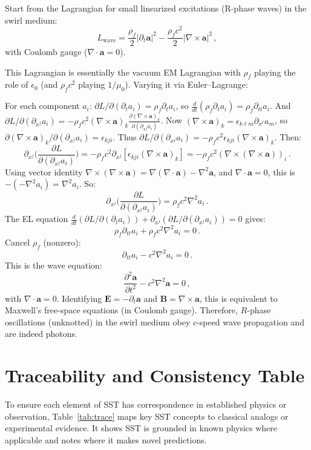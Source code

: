 \documentclass[10pt,reprint,aps,onecolumn,nofootinbib]{revtex4-2}
\begin{document}
	Start from the Lagrangian for small linearized excitations (R-phase waves) in the swirl medium:
	\[
		L_{\text{wave}} = \frac{\rho_f}{2}|\partial_t \mathbf{a}|^2 - \frac{\rho_f c^2}{2}|\nabla \times \mathbf{a}|^2\,,
	\]
	with Coulomb gauge ($\nabla \cdot \mathbf{a}=0$).

	This Lagrangian is essentially the vacuum EM Lagrangian with $\rho_f$ playing the role of $\epsilon_0$ (and $\rho_f c^2$ playing $1/\mu_0$). Varying it via Euler–Lagrange:

	For each component $a_i$: $\partial L/\partial(\partial_t a_i) = \rho_f \partial_t a_i$, so $\frac{d}{dt}(\rho_f \partial_t a_i) = \rho_f \partial_{tt} a_i$. And $\partial L/\partial(\partial_{x^j} a_i) = -\rho_f c^2 (\nabla \times \mathbf{a})_k \frac{\partial (\nabla \times \mathbf{a})_k}{\partial(\partial_{x^j}a_i)}$. Now $(\nabla \times \mathbf{a})_k = \epsilon_{k\ell m}\partial_{x^\ell} a_m$, so $\partial(\nabla \times \mathbf{a})_k/\partial(\partial_{x^j}a_i) = \epsilon_{kji}$. Thus $\partial L/\partial(\partial_{x^j} a_i) = -\rho_f c^2 \epsilon_{kji}(\nabla \times \mathbf{a})_k$. Then:
	\[
		\partial_{x^j}\Big(\frac{\partial L}{\partial(\partial_{x^j} a_i)}\Big) = -\rho_f c^2 \partial_{x^j}[\epsilon_{kji}(\nabla \times \mathbf{a})_k] = -\rho_f c^2 (\nabla \times (\nabla \times \mathbf{a}))_i\,.
	\]
	Using vector identity $\nabla \times (\nabla \times \mathbf{a}) = \nabla(\nabla\cdot\mathbf{a}) - \nabla^2 \mathbf{a}$, and $\nabla\cdot\mathbf{a}=0$, this is $-(-\nabla^2 a_i) = \nabla^2 a_i$. So:
	\[
		\partial_{x^j}\Big(\frac{\partial L}{\partial(\partial_{x^j} a_i)}\Big) = \rho_f c^2 \nabla^2 a_i\,.
	\]
	The EL equation $\frac{d}{dt}(\partial L/\partial(\partial_t a_i)) + \partial_{x^j}(\partial L/\partial(\partial_{x^j}a_i))=0$ gives:
	\[
		\rho_f \partial_{tt} a_i + \rho_f c^2 \nabla^2 a_i = 0\,.
	\]
	Cancel $\rho_f$ (nonzero):
	\[
		\partial_{tt} a_i - c^2 \nabla^2 a_i = 0\,.
	\]
	This is the wave equation:
	\[
		\frac{\partial^2 \mathbf{a}}{\partial t^2} - c^2 \nabla^2 \mathbf{a} = 0\,,
	\]
	with $\nabla\cdot\mathbf{a}=0$. Identifying $\mathbf{E} = -\partial_t \mathbf{a}$ and $\mathbf{B}=\nabla\times\mathbf{a}$, this is equivalent to Maxwell’s free-space equations (in Coulomb gauge). Therefore, $R$-phase oscillations (unknotted) in the swirl medium obey $c$-speed wave propagation and are indeed photons.

	\section{Traceability and Consistency Table}
	To ensure each element of SST has correspondence in established physics or observation, Table~\ref{tab:trace} maps key SST concepts to classical analogs or experimental evidence. It shows SST is grounded in known physics where applicable and notes where it makes novel predictions.
\end{document}
